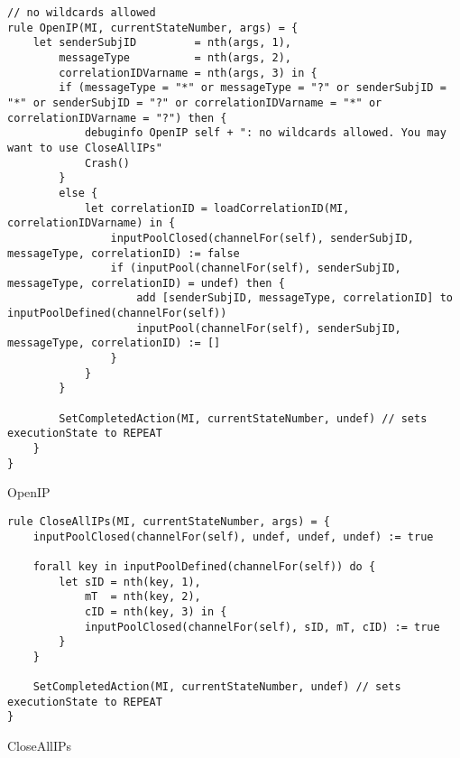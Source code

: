 \begin{listing}[H]
\begin{verbatim}
// no wildcards allowed
rule OpenIP(MI, currentStateNumber, args) = {
    let senderSubjID         = nth(args, 1),
        messageType          = nth(args, 2),
        correlationIDVarname = nth(args, 3) in {
        if (messageType = "*" or messageType = "?" or senderSubjID = "*" or senderSubjID = "?" or correlationIDVarname = "*" or correlationIDVarname = "?") then {
            debuginfo OpenIP self + ": no wildcards allowed. You may want to use CloseAllIPs"
            Crash()
        }
        else {
            let correlationID = loadCorrelationID(MI, correlationIDVarname) in {
                inputPoolClosed(channelFor(self), senderSubjID, messageType, correlationID) := false
                if (inputPool(channelFor(self), senderSubjID, messageType, correlationID) = undef) then {
                    add [senderSubjID, messageType, correlationID] to inputPoolDefined(channelFor(self))
                    inputPool(channelFor(self), senderSubjID, messageType, correlationID) := []
                }
            }
        }

        SetCompletedAction(MI, currentStateNumber, undef) // sets executionState to REPEAT
    }
}
\end{verbatim}
\caption{OpenIP}
\label{lst:asm:OpenIP}
\end{listing}




\begin{listing}[H]
\begin{verbatim}
rule CloseAllIPs(MI, currentStateNumber, args) = {
    inputPoolClosed(channelFor(self), undef, undef, undef) := true

    forall key in inputPoolDefined(channelFor(self)) do {
        let sID = nth(key, 1),
            mT  = nth(key, 2),
            cID = nth(key, 3) in {
            inputPoolClosed(channelFor(self), sID, mT, cID) := true
        }
    }

    SetCompletedAction(MI, currentStateNumber, undef) // sets executionState to REPEAT
}
\end{verbatim}
\caption{CloseAllIPs}
\label{lst:asm:CloseAllIPs}
\end{listing}




